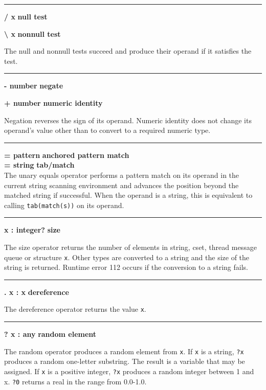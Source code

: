 \bigskip\hrule\vspace{0.1cm}
\noindent
{\bf / x } \hfill {\bf null test}

\noindent
{\bf {\textbackslash} x } \hfill {\bf nonnull test}

\noindent
The null and nonnull tests succeed
and produce their operand if it satisfies the test.

\bigskip\hrule\vspace{0.1cm}
\noindent
{\bf {}- number } \hfill {\bf negate}

\noindent
{\bf + number } \hfill {\bf numeric identity}

\noindent
Negation reverses the sign of its operand. Numeric identity does not
change its operand's value other than to convert to a
required numeric type.

\bigskip\hrule\vspace{0.1cm}
\noindent
{\bf = pattern } \hfill {\bf anchored pattern match} \\
{\bf = string } \hfill {\bf tab/match} \\

\noindent
{}The unary equals operator
performs a pattern match on its operand in the current string scanning
environment and advances the position beyond the matched string
if successful.
When the operand is a string, this is
equivalent to calling \texttt{tab(match(s))} on its operand.

\bigskip\hrule\vspace{0.1cm}
\noindent
{\bf * x : integer? } \hfill {\bf size}

\noindent
The size operator returns the number of elements in
string, cset, thread message queue or structure \texttt{x}.
Other types are converted to a string and the size of the string is returned.
Runtime error 112 occurs if the conversion to a string fails.

\bigskip\hrule\vspace{0.1cm}
\noindent
{\bf . x : x } \hfill {\bf dereference}

\noindent
The dereference operator returns the value
\texttt{x}.

\bigskip\hrule\vspace{0.1cm}
\noindent
{\bf ? x : any } \hfill {\bf random element}

\noindent
The random operator produces a random element
from \texttt{x}. If \texttt{x} is a string, \texttt{?x} produces a
random one-letter substring. The result is a variable that may be
assigned. If \texttt{x} is a positive integer, \texttt{?x} produces a
random integer between 1 and x.  \texttt{?0} returns a real in the
range from 0.0-1.0.

